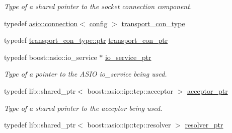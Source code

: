 \begin{DoxyCompactItemize}
\begin{DoxyCompactList}\small\item\em Type of a shared pointer to the socket connection component. \end{DoxyCompactList}\item 
typedef \hyperlink{classwebsocketpp_1_1transport_1_1asio_1_1connection}{asio\+::connection}$<$ \hyperlink{classconfig}{config} $>$ \hyperlink{classwebsocketpp_1_1transport_1_1asio_1_1endpoint_a75f3102766fd3ba8230e99a2b0e00457}{transport\+\_\+con\+\_\+type}
\item 
typedef \hyperlink{classwebsocketpp_1_1transport_1_1asio_1_1connection_aa6f25556860a154c4dacb4dac1dce8e4}{transport\+\_\+con\+\_\+type\+::ptr} \hyperlink{classwebsocketpp_1_1transport_1_1asio_1_1endpoint_ac5fc306f32d15f92dd1b22366eaba62d}{transport\+\_\+con\+\_\+ptr}
\item 
typedef boost\+::asio\+::io\+\_\+service $\ast$ \hyperlink{classwebsocketpp_1_1transport_1_1asio_1_1endpoint_ae97c65823630f00c2418578012cb7788}{io\+\_\+service\+\_\+ptr}\hypertarget{classwebsocketpp_1_1transport_1_1asio_1_1endpoint_ae97c65823630f00c2418578012cb7788}{}\label{classwebsocketpp_1_1transport_1_1asio_1_1endpoint_ae97c65823630f00c2418578012cb7788}

\begin{DoxyCompactList}\small\item\em Type of a pointer to the A\+S\+IO io\+\_\+service being used. \end{DoxyCompactList}\item 
typedef lib\+::shared\+\_\+ptr$<$ boost\+::asio\+::ip\+::tcp\+::acceptor $>$ \hyperlink{classwebsocketpp_1_1transport_1_1asio_1_1endpoint_a8cee505eac68b88f2cfa8e33b3c8a1b3}{acceptor\+\_\+ptr}\hypertarget{classwebsocketpp_1_1transport_1_1asio_1_1endpoint_a8cee505eac68b88f2cfa8e33b3c8a1b3}{}\label{classwebsocketpp_1_1transport_1_1asio_1_1endpoint_a8cee505eac68b88f2cfa8e33b3c8a1b3}

\begin{DoxyCompactList}\small\item\em Type of a shared pointer to the acceptor being used. \end{DoxyCompactList}\item 
typedef lib\+::shared\+\_\+ptr$<$ boost\+::asio\+::ip\+::tcp\+::resolver $>$ \hyperlink{classwebsocketpp_1_1transport_1_1asio_1_1endpoint_a532cece537ac17dffe342a9b36d5c1a1}{resolver\+\_\+ptr}\hypertarget{classwebsocketpp_1_1transport_1_1asio_1_1endpoint_a532cece537ac17dffe342a9b36d5c1a1}{}\label{classwebsocketpp_1_1transport_1_1asio_1_1endpoint_a532cece537ac17dffe342a9b36d5c1a1}


\end{DoxyCompactItemize}
